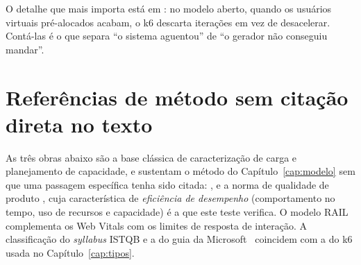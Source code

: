 \documentclass[11pt, a4paper, oneside, openany]{report}
\begin{document}
O detalhe que mais importa está em : no modelo aberto,
quando os usuários virtuais pré-alocados acabam, o k6 descarta iterações em vez
de desacelerar. Contá-las é o que separa \enquote{o sistema aguentou} de
\enquote{o gerador não conseguiu mandar}.

\chapter{Referências de método sem citação direta no texto}

As três obras abaixo são a base clássica de caracterização de carga e
planejamento de capacidade, e sustentam o método do Capítulo~\ref{cap:modelo}
sem que uma passagem específica tenha sido citada: ,
 e a norma de qualidade de produto
, cuja característica de \emph{eficiência de
desempenho} (comportamento no tempo, uso de recursos e capacidade) é a que este
teste verifica. O modelo RAIL~\cite{rail} complementa os Web Vitals com os
limites de resposta de interação. A classificação do \emph{syllabus} ISTQB e a
do guia da Microsoft~\cite{meier2007} coincidem com a do k6 usada no
Capítulo~\ref{cap:tipos}.


\end{document}
